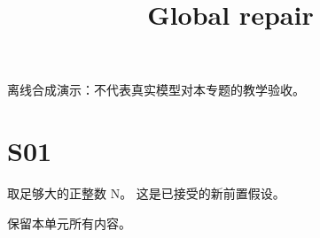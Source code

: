 \documentclass[UTF8,fontset=fandol,11pt]{ctexart}
\title{Global repair}
\date{}
\begin{document}
\maketitle
\par\noindent 离线合成演示：不代表真实模型对本专题的教学验收。\par
\section{S01}\label{sec:S01}
取足够大的正整数 N。 这是已接受的新前置假设。\par
保留本单元所有内容。\par
\end{document}
